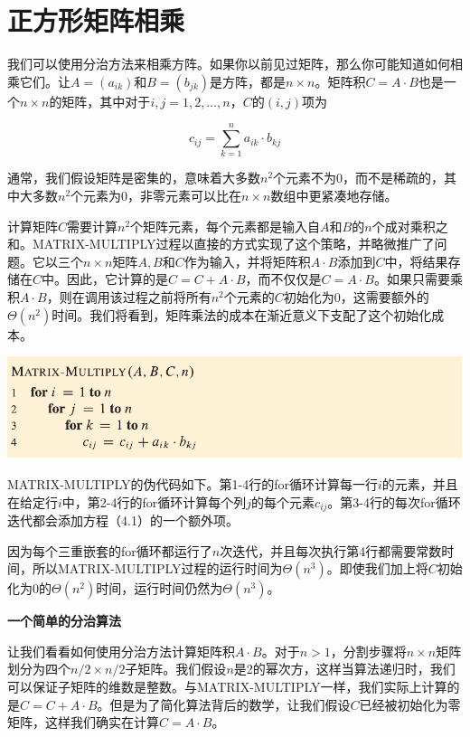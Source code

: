 \documentclass[lang=cn,newtx,10pt,scheme=chinese]{elegantbook}
\begin{document}
\section{正方形矩阵相乘}\label{section-4.1}

我们可以使用分治方法来相乘方阵。如果你以前见过矩阵，那么你可能知道如何相乘它们。让$A=(a_{i k})$和$B=(b_{j k})$是方阵，都是$n \times n$。矩阵积$C=A \cdot B$也是一个$n \times n$的矩阵，其中对于$i, j=1,2, \ldots, n$，$C$的$(i, j)$项为

\begin{equation}
c_{i j}=\sum_{k=1}^n a_{i k} \cdot b_{k j}
\end{equation}

通常，我们假设矩阵是密集的，意味着大多数$n^2$个元素不为0，而不是稀疏的，其中大多数$n^2$个元素为0，非零元素可以比在$n \times n$数组中更紧凑地存储。

计算矩阵$C$需要计算$n^2$个矩阵元素，每个元素都是输入自$A$和$B$的$n$个成对乘积之和。MATRIX-MULTIPLY过程以直接的方式实现了这个策略，并略微推广了问题。它以三个$n \times n$矩阵$A, B$和$C$作为输入，并将矩阵积$A \cdot B$添加到$C$中，将结果存储在$C$中。因此，它计算的是$C=C+A \cdot B$，而不仅仅是$C=A \cdot B$。如果只需要乘积$A \cdot B$，则在调用该过程之前将所有$n^2$个元素的$C$初始化为0，这需要额外的$\Theta(n^2)$时间。我们将看到，矩阵乘法的成本在渐近意义下支配了这个初始化成本。

\includegraphics{算法导论第四版插图/第四章/普通矩阵相乘算法.pdf}

MATRIX-MULTIPLY的伪代码如下。第1-4行的for循环计算每一行$i$的元素，并且在给定行$i$中，第2-4行的for循环计算每个列$j$的每个元素$c_{i j}$。第3-4行的每次for循环迭代都会添加方程（4.1）的一个额外项。

因为每个三重嵌套的for循环都运行了$n$次迭代，并且每次执行第4行都需要常数时间，所以MATRIX-MULTIPLY过程的运行时间为$\Theta(n^3)$。即使我们加上将$C$初始化为0的$\Theta(n^2)$时间，运行时间仍然为$\Theta(n^3)$。

\textbf{一个简单的分治算法}

让我们看看如何使用分治方法计算矩阵积$A \cdot B$。对于$n>1$，分割步骤将$n \times n$矩阵划分为四个$n / 2 \times n / 2$子矩阵。我们假设$n$是2的幂次方，这样当算法递归时，我们可以保证子矩阵的维数是整数。与MATRIX-MULTIPLY一样，我们实际上计算的是$C=C+A \cdot B$。但是为了简化算法背后的数学，让我们假设$C$已经被初始化为零矩阵，这样我们确实在计算$C=A \cdot B$。
\end{document}
